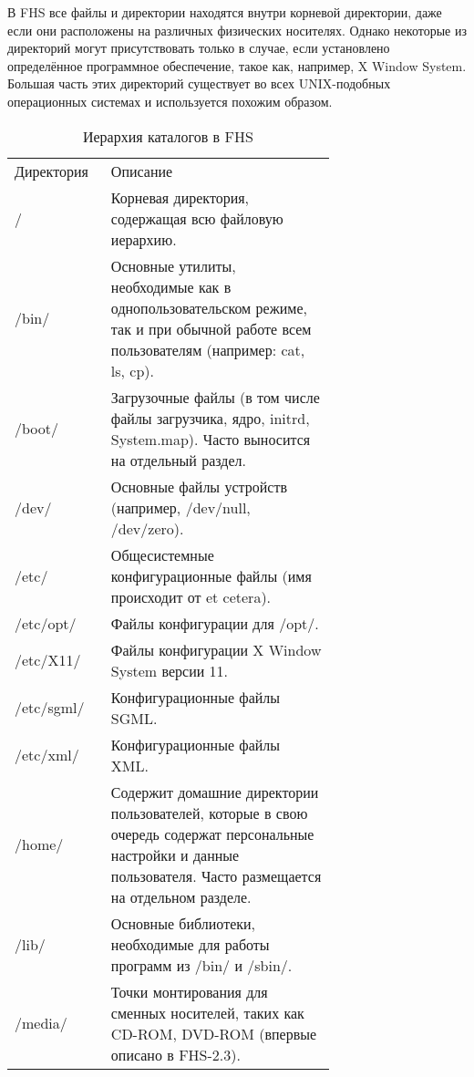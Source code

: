 В FHS все файлы и директории находятся внутри корневой директории, даже если они расположены на различных физических носителях. Однако некоторые из директорий могут присутствовать только в случае, если установлено определённое программное обеспечение, такое как, например, X Window System. Большая часть этих директорий существует во всех UNIX-подобных операционных системах и используется похожим образом.
\begin{table}
\caption{Иерархия каталогов в FHS}
\label{tabular:fhs}
\begin{center}
\begin{tabular}{|l|p{0.7\linewidth}|}
\hline
Директория & 	Описание \\
/  &	Корневая директория, содержащая всю файловую иерархию. \\
/bin/ & 	Основные утилиты, необходимые как в однопользовательском режиме, так и при обычной работе всем пользователям (например: cat, ls, cp). \\
/boot/ & 	Загрузочные файлы (в том числе файлы загрузчика, ядро, initrd, System.map). Часто выносится на отдельный раздел. \\
/dev/ &	Основные файлы устройств (например, /dev/null, /dev/zero). \\
/etc/ &	Общесистемные конфигурационные файлы (имя происходит от et cetera). \\
/etc/opt/ & Файлы конфигурации для /opt/. \\
/etc/X11/ & Файлы конфигурации X Window System версии 11. \\
/etc/sgml/ & Конфигурационные файлы SGML. \\
/etc/xml/ & Конфигурационные файлы XML. \\
/home/ & 	Содержит домашние директории пользователей, которые в свою очередь содержат персональные настройки и данные пользователя. Часто размещается на отдельном разделе. \\
/lib/ &	Основные библиотеки, необходимые для работы программ из /bin/ и /sbin/. \\
/media/ & 	Точки монтирования для сменных носителей, таких как CD-ROM, DVD-ROM (впервые описано в FHS-2.3). \\

\end{tabular}
\end{center}
\end{table}
